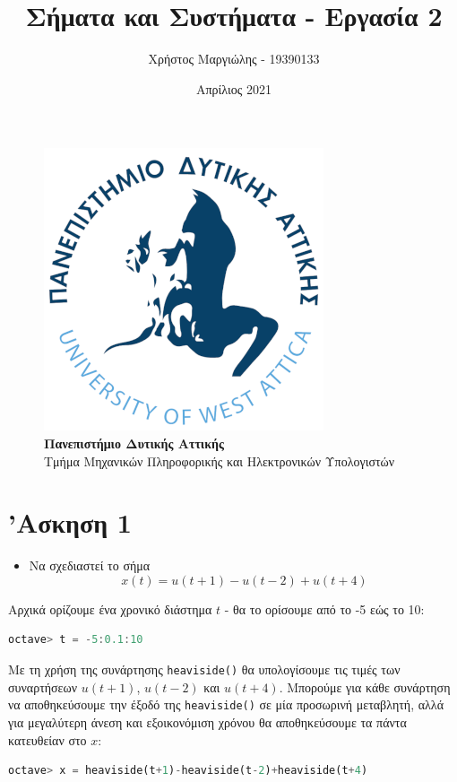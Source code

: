 \documentclass{article}
\title{Σήματα και Συστήματα - Εργασία 2}
\author{Χρήστος Μαργιώλης - 19390133}
\date{Απρίλιος 2021}
\begin{document}
\begin{titlepage}
        \maketitle
        \begin{figure}[t!]
        \begin{center}
        \includegraphics[scale=0.3]{./res/uniwalogo.png} \\
        \Large
        \textbf{Πανεπιστήμιο Δυτικής Αττικής} \\
        \large
        Τμήμα Μηχανικών Πληροφορικής και Ηλεκτρονικών Υπολογιστών
        \end{center}
        \end{figure}
\end{titlepage}

\renewcommand{\contentsname}{Περιεχόμενα}
\tableofcontents

\section{'Ασκηση 1}

\begin{itemize}
        \item Να σχεδιαστεί το σήμα
                \[x(t) = u(t + 1) - u(t - 2) + u(t + 4)\]
\end{itemize}

Αρχικά ορίζουμε ένα χρονικό διάστημα $t$ - θα το ορίσουμε από το -5 εώς το 10:
\begin{lstlisting}[language=octave]
        octave> t = -5:0.1:10
\end{lstlisting}

Με τη χρήση της συνάρτησης \lstinline{heaviside()} θα υπολογίσουμε τις
τιμές των συναρτήσεων $u(t + 1)$, $u(t - 2)$ και $u(t + 4)$. Μπορούμε
για κάθε συνάρτηση να αποθηκεύσουμε την έξοδό της \lstinline{heaviside()}
σε μία προσωρινή μεταβλητή, αλλά για μεγαλύτερη άνεση και εξοικονόμιση
χρόνου θα αποθηκεύσουμε τα πάντα κατευθείαν στο $x$:
\begin{lstlisting}[language=octave]
        octave> x = heaviside(t+1)-heaviside(t-2)+heaviside(t+4)
\end{lstlisting}
\end{document}
